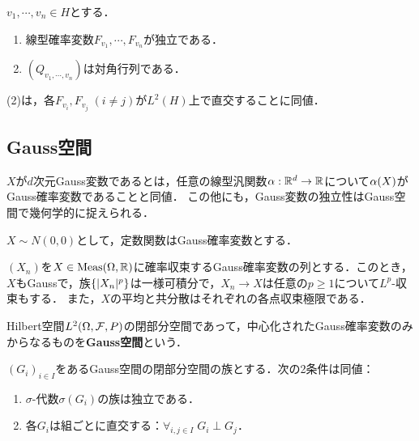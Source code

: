 \documentclass[uplatex,dvipdfmx]{jsreport}
\begin{document}
\begin{proposition}[Gauss変数の独立性の特徴付け]
    $v_1,\cdots,v_n\in H$とする．
    \begin{enumerate}
        \item 線型確率変数$F_{v_1},\cdots,F_{v_n}$が独立である．
        \item $(Q_{v_1,\cdots,v_n})$は対角行列である．
    \end{enumerate}
    (2)は，各$F_{v_i},F_{v_j}\;(i\ne j)$が$L^2(H)$上で直交することに同値．
\end{proposition}

\subsection{Gauss空間}

\begin{tcolorbox}[colframe=ForestGreen, colback=ForestGreen!10!white,breakable,colbacktitle=ForestGreen!40!white,coltitle=black,fonttitle=\bfseries\sffamily,
    title=]
    $X$が$d$次元Gauss変数であるとは，任意の線型汎関数$\alpha:\mathbb{R}^d\to\mathbb{R}$について$\alpha(X)$がGauss確率変数であることと同値．
    この他にも，Gauss変数の独立性はGauss空間で幾何学的に捉えられる．
\end{tcolorbox}

\begin{notation}
    $X\sim N(0,0)$として，定数関数はGauss確率変数とする．
\end{notation}

\begin{proposition}[Gauss確率変数全体の空間は閉部分空間をなす]
    $(X_n)$を$X\in\mathrm{Meas}(\Omega,\mathbb{R})$に確率収束するGauss確率変数の列とする．このとき，$X$もGaussで，族$\{\lvert X_n\rvert^p\}$は一様可積分で，$X_n\to X$は任意の$p\ge1$について$L^p$-収束もする．
    また，$X$の平均と共分散はそれぞれの各点収束極限である．
\end{proposition}

\begin{definition}
    Hilbert空間$L^2(\Omega,\mathcal{F},P)$の閉部分空間であって，中心化されたGauss確率変数のみからなるものを\textbf{Gauss空間}という．
\end{definition}

\begin{proposition}[独立性の特徴付け]
    $(G_i)_{i\in I}$をあるGauss空間の閉部分空間の族とする．次の2条件は同値：
    \begin{enumerate}
        \item $\sigma$-代数$\sigma(G_i)$の族は独立である．
        \item 各$G_i$は組ごとに直交する：$\forall_{i,j\in I}\;G_i\perp G_j$．
    \end{enumerate}
\end{proposition}
\end{document}
